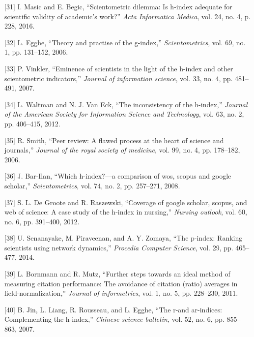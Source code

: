 \documentclass[12pt]{article}
\begin{document}
\leavevmode\hypertarget{ref-masic16:scientometric}{}%
{[}31{]} I. Masic and E. Begic, ``Scientometric dilemma: Is h-index adequate for scientific validity of academic's work?'' \emph{Acta Informatica Medica}, vol. 24, no. 4, p. 228, 2016.

\leavevmode\hypertarget{ref-egghe06:theory}{}%
{[}32{]} L. Egghe, ``Theory and practise of the g-index,'' \emph{Scientometrics}, vol. 69, no. 1, pp. 131--152, 2006.

\leavevmode\hypertarget{ref-vinkler07:eminence}{}%
{[}33{]} P. Vinkler, ``Eminence of scientists in the light of the h-index and other scientometric indicators,'' \emph{Journal of information science}, vol. 33, no. 4, pp. 481--491, 2007.

\leavevmode\hypertarget{ref-waltman12:inconsistency}{}%
{[}34{]} L. Waltman and N. J. Van Eck, ``The inconsistency of the h-index,'' \emph{Journal of the American Society for Information Science and Technology}, vol. 63, no. 2, pp. 406--415, 2012.

\leavevmode\hypertarget{ref-smith06:peer}{}%
{[}35{]} R. Smith, ``Peer review: A flawed process at the heart of science and journals,'' \emph{Journal of the royal society of medicine}, vol. 99, no. 4, pp. 178--182, 2006.

\leavevmode\hypertarget{ref-barilan08:hindex}{}%
{[}36{]} J. Bar-Ilan, ``Which h-index?---a comparison of wos, scopus and google scholar,'' \emph{Scientometrics}, vol. 74, no. 2, pp. 257--271, 2008.

\leavevmode\hypertarget{ref-degroote12:coverage}{}%
{[}37{]} S. L. De Groote and R. Raszewski, ``Coverage of google scholar, scopus, and web of science: A case study of the h-index in nursing,'' \emph{Nursing outlook}, vol. 60, no. 6, pp. 391--400, 2012.

\leavevmode\hypertarget{ref-senanayake14:pindex}{}%
{[}38{]} U. Senanayake, M. Piraveenan, and A. Y. Zomaya, ``The p-index: Ranking scientists using network dynamics,'' \emph{Procedia Computer Science}, vol. 29, pp. 465--477, 2014.

\leavevmode\hypertarget{ref-bornmann11:further}{}%
{[}39{]} L. Bornmann and R. Mutz, ``Further steps towards an ideal method of measuring citation performance: The avoidance of citation (ratio) averages in field-normalization,'' \emph{Journal of informetrics}, vol. 1, no. 5, pp. 228--230, 2011.

\leavevmode\hypertarget{ref-jin07:rindex}{}%
{[}40{]} B. Jin, L. Liang, R. Rousseau, and L. Egghe, ``The r-and ar-indices: Complementing the h-index,'' \emph{Chinese science bulletin}, vol. 52, no. 6, pp. 855--863, 2007.
\end{document}
